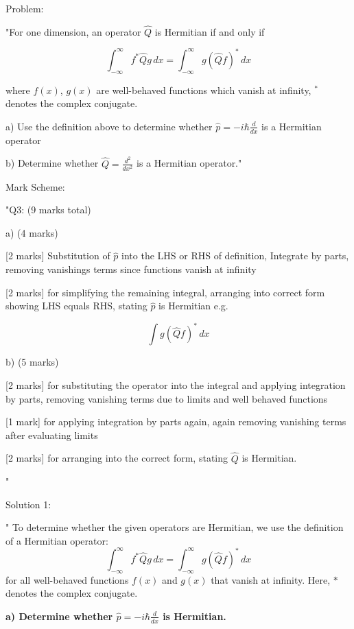 Problem: 

"For one dimension, an operator \( \hat{Q} \) is Hermitian if and only if 

\[ \int_{-\infty}^{\infty} f^{*}\hat{Q}g \, dx = \int_{-\infty}^{\infty} g(\hat{Q}f)^{*} \, dx \]

where \( f(x) \), \( g(x) \) are well-behaved functions which vanish at infinity, \( ^{*} \) denotes the complex conjugate. 

a) Use the definition above to determine whether \( \hat{p} = -i\hbar\frac{d}{dx} \) is a Hermitian operator 

b) Determine whether \( \hat{Q} = \frac{d^{2}}{dx^{2}} \) is a Hermitian operator."

Mark Scheme:

"{Q3: (9 marks total)}

a) (4 marks)

[2 marks] Substitution of \( \hat{p} \) into the LHS or RHS of definition, Integrate by parts, removing vanishings terms since functions vanish at infinity 

[2 marks] for simplifying the remaining integral, arranging into correct form showing LHS equals RHS, stating  \( \hat{p} \) is Hermitian e.g. 

\[ \int g (\hat{Q}f)^{*} \, dx \]

b) (5 marks)

[2 marks] for substituting the operator into the integral and applying integration by parts, removing vanishing terms due to limits and well behaved functions

[1 mark] for applying integration by parts again, again removing vanishing terms after evaluating limits

[2 marks] for arranging into the correct form, stating \(\hat{Q}\) is Hermitian. 

"

Solution 1: 

"
To determine whether the given operators are Hermitian, we use the definition of a Hermitian operator:
\[
\int_{-\infty}^\infty f^* \hat{Q} g \, dx = \int_{-\infty}^\infty g (\hat{Q} f)^* \, dx
\]
for all well-behaved functions $f(x)$ and $g(x)$ that vanish at infinity. Here, $*$ denotes the complex conjugate.

\textbf{a) Determine whether $\hat{p} = -i\hbar \frac{d}{dx}$ is Hermitian.}

